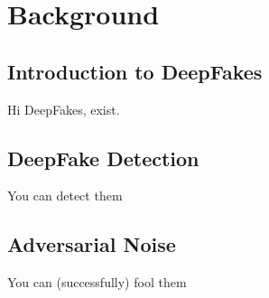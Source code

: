 \chapter{Background}
\label{ch:background}

\section{Introduction to DeepFakes}

Hi DeepFakes, exist.

\section{DeepFake Detection}

You can detect them

\section{Adversarial Noise}

You can (successfully) fool them